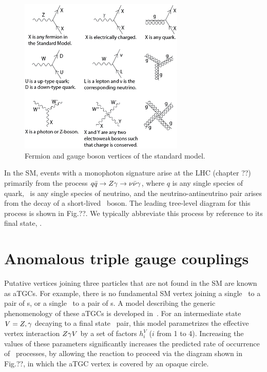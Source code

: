 \documentclass[oneside, letterpaper, 12pt, oldfontcommands]{memoir}
\begin{document}
\begin{figure}[hbtp]
  \begin{center}
    \includegraphics[width=0.7\textwidth]{Figures/Standard_Model_Feynman_Diagram_Vertices.png}
    \caption{
      Fermion and gauge boson vertices of the standard model.
    }
    \label{fig:sm_vertices}
  \end{center}
\end{figure}

In the SM, events with a monophoton signature arise at the LHC (chapter ??) primarily from the process $q\bar{q} \to Z\gamma \to \nu\bar{\nu}\gamma$,
where $q$ is any single species of quark, \Pn\ is any single species of neutrino, and the neutrino-antineutrino pair arises from the decay
of a short-lived \PZ\ boson. The leading tree-level diagram for this process is shown in Fig.??. We typically abbreviate this process by
reference to its final state, \zinvg.



\section{Anomalous triple gauge couplings} \label{sec:introduction_aTGC}
Putative vertices joining three particles that are not found in the SM are known as aTGCs. For example, there is no fundamental SM vertex
joining a single \Pgamma\ to a pair of \PZ s, or a single \PZ\ to a pair of \Pgamma s. A model
describing the generic phenomenology of these aTGCs is developed in~\cite{ref:Nucl.Phys.0550-3213_87_90685-7, ref:PhysRevD.47.4889, ref:PhysRevD.62.113011}.
For an intermediate state $V = Z,\gamma$ decaying to a final state \PZ\Pgamma\ pair, this model parametrizes the effective vertex interaction $Z\gamma V$
by a set of factors $h_{i}^{V}$ ($i$ from 1 to 4). Increasing the values of these parameters significantly increases the predicted rate of occurrence
of \zinvg\ processes, by allowing the reaction to proceed via the diagram shown in Fig.??, in which the aTGC vertex is covered by an opaque circle.
\end{document}
